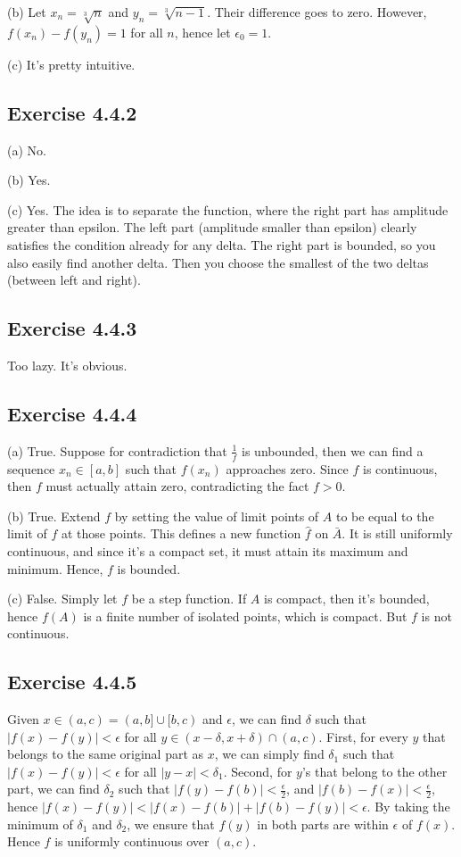\documentclass{book}
\begin{document}
\noindent
(b)
Let $x_n = \sqrt[3]{n}$ and $y_n = \sqrt[3]{n - 1}$. Their difference goes to zero. However, $f(x_n) - f(y_n) = 1$ for all $n$, hence let $\epsilon_0 = 1$.

\noindent
(c)
It's pretty intuitive.

\subsection*{Exercise 4.4.2}
(a)
No.

\noindent
(b)
Yes.

\noindent
(c)
Yes. The idea is to separate the function, where the right part has amplitude greater than epsilon. The left part (amplitude smaller than epsilon) clearly satisfies the condition already for any delta. The right part is bounded, so you also easily find another delta. Then you choose the smallest of the two deltas (between left and right).

\subsection*{Exercise 4.4.3}
Too lazy. It's obvious.

\subsection*{Exercise 4.4.4}
(a)
True. Suppose for contradiction that $\frac{1}{f}$ is unbounded, then we can find a sequence $x_n \in [a, b]$ such that $f(x_n)$ approaches zero. Since $f$ is continuous, then $f$ must actually attain zero, contradicting the fact $f > 0$.

\noindent
(b)
True. Extend $f$ by setting the value of limit points of $A$ to be equal to the limit of $f$ at those points. This defines a new function $\hat{f}$ on $\bar{A}$. It is still uniformly continuous, and since it's a compact set, it must attain its maximum and minimum. Hence, $f$ is bounded.

\noindent
(c)
False. Simply let $f$ be a step function. If $A$ is compact, then it's bounded, hence $f(A)$ is a finite number of isolated points, which is compact. But $f$ is not continuous.

\subsection*{Exercise 4.4.5}
Given $x \in (a, c) = (a, b] \cup [b, c)$ and $\epsilon$, we can find $\delta$ such that $|f(x) - f(y)| < \epsilon$ for all $y \in (x - \delta, x + \delta) \cap (a, c)$. First, for every $y$ that belongs to the same original part as $x$, we can simply find $\delta_1$ such that $|f(x) - f(y)| < \epsilon$ for all $|y - x| < \delta_1$. Second, for $y$'s that belong to the other part, we can find $\delta_2$ such that $|f(y) - f(b)| < \frac{\epsilon}{2}$, and $|f(b) - f(x)| < \frac{\epsilon}{2}$, hence $|f(x) - f(y)| < |f(x) - f(b)| + |f(b) - f(y)| < \epsilon$. By taking the minimum of $\delta_1$ and $\delta_2$, we ensure that $f(y)$ in both parts are within $\epsilon$ of $f(x)$. Hence $f$ is uniformly continuous over $(a, c)$.
\end{document}
